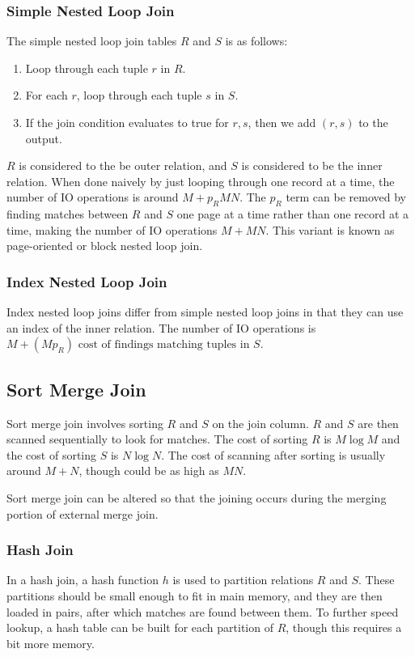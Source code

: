 \documentclass[12pt,titlepage]{article}
\begin{document}
      \subsubsection{Simple Nested Loop Join}
        The simple nested loop join tables $R$ and $S$ is as follows:
        \begin{enumerate}
          \item Loop through each tuple $r$ in $R$.
          \item For each $r$, loop through each tuple $s$ in $S$.
          \item If the join condition evaluates to true for $r, s$, then we add $(r, s)$ to the output.
        \end{enumerate}

        $R$ is considered to the be outer relation, and $S$ is considered to be the inner relation. When done naively by just looping through one record at a
        time, the number of IO operations is around $M + p_R M N$. The $p_R$ term can be removed by finding matches between $R$ and $S$ one page at a time
        rather than one record at a time, making the number of IO operations $M + M N$. This variant is known as page-oriented or block nested loop join.

      \subsubsection{Index Nested Loop Join}
        Index nested loop joins differ from simple nested loop joins in that they can use an index of the inner relation. The number of IO operations is
        $M + (M p_R) \text{ cost of findings matching tuples in } S$.

      \subsection{Sort Merge Join}
        Sort merge join involves sorting $R$ and $S$ on the join column. $R$ and $S$ are then scanned sequentially to look for matches. The cost of sorting
        $R$ is $M \log{M}$ and the cost of sorting $S$ is $N \log{N}$. The cost of scanning after sorting is usually around $M + N$, though could be as high
        as $M N$.

        Sort merge join can be altered so that the joining occurs during the merging portion of external merge join.

      \subsubsection{Hash Join}
        In a hash join, a hash function $h$ is used to partition relations $R$ and $S$. These partitions should be small enough to fit in main memory, and they
        are then loaded in pairs, after which matches are found between them. To further speed lookup, a hash table can be built for each partition of $R$,
        though this requires a bit more memory.
\end{document}
